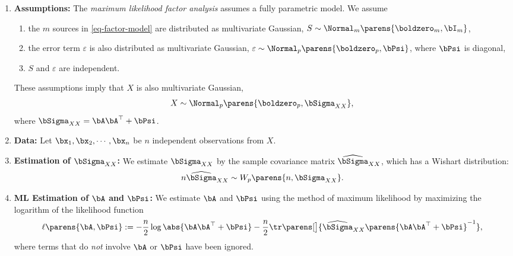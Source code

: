 \documentclass[12pt]{article}
\begin{document}
\begin{enumerate}[label=\textbf{\arabic*.}]
	
	\item \textbf{Assumptions:} The \textit{maximum likelihood factor analysis} assumes a fully parametric model. We assume 
	\begin{enumerate}
		\item the $m$ sources in \eqref{eq-factor-model} are distributed as multivariate Gaussian, $S \sim \Normal_m \parens{\boldzero_m, \bI_m}$, 
		\item the error term $\varepsilon$ is also distributed as multivariate Gaussian, $\varepsilon \sim \Normal_p \parens{\boldzero_p, \bPsi}$, where $\bPsi$ is diagonal, 
		\item $S$ and $\varepsilon$ are independent. 
	\end{enumerate}
	These assumptions imply that $X$ is also multivariate Gaussian, 
	\begin{align}
		X \sim \Normal_p \parens{\boldzero_p, \bSigma_{XX}}, 
	\end{align}
	where $\bSigma_{XX} = \bA \bA^\top + \bPsi$. 
	
	\item \textbf{Data:} Let $\bx_1, \bx_2, \cdots, \bx_n$ be $n$ independent observations from $X$. 
	
	\item \textbf{Estimation of $\bSigma_{XX}$:} We estimate $\bSigma_{XX}$ by the sample covariance matrix $\widehat{\bSigma}_{XX}$, which has a Wishart distribution: 
	\begin{align*}
		n \widehat{\bSigma}_{XX} \sim W_p \parens{n, \bSigma_{XX}}. 
	\end{align*}
	
	\item \textbf{ML Estimation of $\bA$ and $\bPsi$:} We estimate $\bA$ and $\bPsi$ using the method of maximum likelihood by maximizing the logarithm of the likelihood function 
	\begin{align}
		\ell \parens{\bA, \bPsi} := - \frac{n}{2} \log \abs{\bA \bA^\top + \bPsi} - \frac{n}{2} \tr \parens[\big]{\widehat{\bSigma}_{XX} \parens{\bA \bA^\top + \bPsi}^{-1}}, 
	\end{align}
	where terms that do \emph{not} involve $\bA$ or $\bPsi$ have been ignored. 
	

\end{enumerate}
\end{document}
